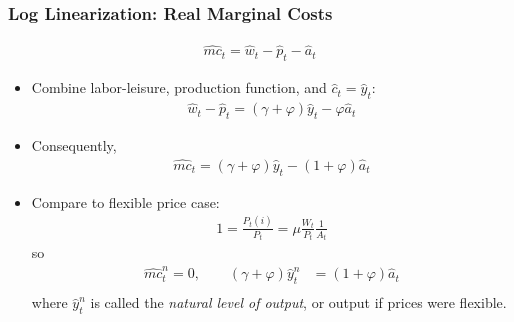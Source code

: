 \documentclass[11pt,aspectratio=169,xcolor={dvipsnames},hyperref={pdftex,pdfpagemode=UseNone,hidelinks,pdfdisplaydoctitle=true},usepdftitle=false]{beamer}
\begin{document}
\begin{frame}
\frametitle{Log Linearization: Real Marginal Costs
}
\begin{align*}
	\hat{mc}_t=\hat{w}_t-\hat{p}_t-\hat{a}_t
\end{align*}
\begin{itemize}
	\item Combine labor-leisure, production function, and $\hat{c}_t=\hat{y}_t$:
	\begin{align*}
		\hat{w}_t-\hat{p}_t=(\gamma+\varphi)\hat{y}_t-\varphi\hat{a}_t
\end{align*}
	\item Consequently,
	\begin{align*}
	\hat{mc}_t=(\gamma+\varphi)\hat{y}_t-(1+\varphi)\hat{a}_t
\end{align*}
\item Compare to flexible price case:
\begin{align*}
	1 = \frac{P_t(i)}{P_t} = \mu\frac{W_t}{P_t}\frac{1}{A_t} 
\end{align*}
so
\begin{align*}
	\hat{mc}_t^{n} = 0,\qquad (\gamma+\varphi)\hat{y}_t^{n}&=(1+\varphi)\hat{a}_t \\
\end{align*}
where $\hat{y}_t^{n}$ is called the \emph{natural level of output}, or output if prices were flexible.
\end{itemize}
\end{frame}
\end{document}
